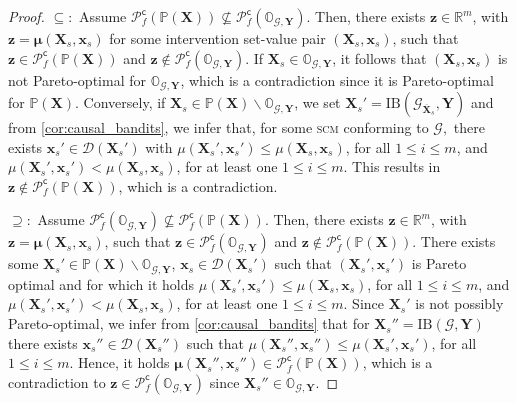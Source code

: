 \begin{proof}
    $\subseteq:$ Assume $\mathcal{P}_f^{\textsf{c}}(\mathbb{P}(\mathbf{X})) \not\subseteq \mathcal{P}_f^{\textsf{c}}(\mathbb{O}_{\mathcal{G},\mathbf{Y}})$. 
    Then, there exists $\mathbf{z} \in \mathbb{R}^m$, with $\mathbf{z}= \boldsymbol{\mu}(\mathbf{X}_s,\mathbf{x}_s)$ for some intervention set-value pair $(\mathbf{X}_s,\mathbf{x}_s)$, such that $\mathbf{z} \in \mathcal{P}_f^{\textsf{c}}(\mathbb{P}(\mathbf{X}))$ and $\mathbf{z} \not\in \mathcal{P}_f^{\textsf{c}}(\mathbb{O}_{\mathcal{G},\mathbf{Y}})$. 
    If $\mathbf{X}_s \in \mathbb{O}_{\mathcal{G},\mathbf{Y}}$, it follows that $(\mathbf{X}_s,\mathbf{x}_s)$ is not Pareto-optimal for $\mathbb{O}_{\mathcal{G},\mathbf{Y}}$, which is a contradiction since it is Pareto-optimal for $\mathbb{P}(\mathbf{X})$. 
    Conversely, if $\mathbf{X}_s \in \mathbb{P}(\mathbf{X}) \backslash  \mathbb{O}_{\mathcal{G},\mathbf{Y}}$, we set $\mathbf{X}_s' = \text{IB}(\mathcal{G}_{\overline{\mathbf{X}}_s},\mathbf{Y})$ and from \cref{cor:causal_bandits}, we infer that, for some \textsc{scm} conforming to $\mathcal{G},$ there exists $\mathbf{x}_s' \in \mathcal{D}(\mathbf{X}_s')$ with $\mu(\mathbf{X}_s',\mathbf{x}_s') \leq \mu(\mathbf{X}_s,\mathbf{x}_s)$, for all $1\leq i \leq m$, and $\mu(\mathbf{X}_s',\mathbf{x}_s') < \mu(\mathbf{X}_s,\mathbf{x}_s)$, for at least one $1\leq i \leq m$. This results in $\mathbf{z} \not\in \mathcal{P}_f^{\textsf{c}}(\mathbb{P}(\mathbf{X}))$, which is a contradiction. 

    $\supseteq:$ Assume $\mathcal{P}_f^{\textsf{c}}(\mathbb{O}_{\mathcal{G},\mathbf{Y}}) \not\subseteq  \mathcal{P}_f^{\textsf{c}}(\mathbb{P}(\mathbf{X})) $. Then, there exists $\mathbf{z} \in \mathbb{R}^m$, with $\mathbf{z}= \boldsymbol{\mu}(\mathbf{X}_s,\mathbf{x}_s)$, such that $\mathbf{z} \in \mathcal{P}_f^{\textsf{c}}(\mathbb{O}_{\mathcal{G},\mathbf{Y}})$ and $\mathbf{z} \not\in \mathcal{P}_f^{\textsf{c}}(\mathbb{P}(\mathbf{X}))$. There exists some $\mathbf{X}_s' \in \mathbb{P}(\mathbf{X}) \backslash  \mathbb{O}_{\mathcal{G},\mathbf{Y}}$, $\mathbf{x}_s \in \mathcal{D}(\mathbf{X}_s')$ such that $(\mathbf{X}_s',\mathbf{x}_s')$ is Pareto optimal and for which it holds $\mu(\mathbf{X}_s',\mathbf{x}_s') \leq \mu(\mathbf{X}_s,\mathbf{x}_s)$, for all $1\leq i \leq m$, and $\mu(\mathbf{X}_s',\mathbf{x}_s') < \mu(\mathbf{X}_s,\mathbf{x}_s)$, for at least one $1\leq i \leq m$. Since $\mathbf{X}_s'$ is not possibly Pareto-optimal, we infer from \cref{cor:causal_bandits} that for $\mathbf{X}_s'' = \text{IB}(\mathcal{G},\mathbf{Y})$ there exists $\mathbf{x}_s'' \in \mathcal{D}(\mathbf{X}_s'')$ such that $\mu(\mathbf{X}_s'',\mathbf{x}_s'') \leq \mu(\mathbf{X}_s',\mathbf{x}_s')$, for all $1\leq i \leq m$. Hence, it holds $\boldsymbol{\mu}(\mathbf{X}_s'',\mathbf{x}_s'') \in \mathcal{P}_f^{\textsf{c}}(\mathbb{P}(\mathbf{X}))$, which is a contradiction to $\mathbf{z} \in \mathcal{P}_f^{\textsf{c}}(\mathbb{O}_{\mathcal{G},\mathbf{Y}})$ since $\mathbf{X}_s'' \in \mathbb{O}_{\mathcal{G},\mathbf{Y}}$.
\end{proof}

